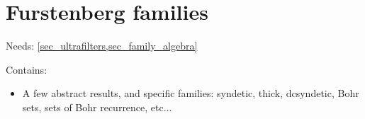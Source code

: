 



        

\section{Furstenberg families}
\label{sec_furstenberg_families}

Needs: \cref{sec_ultrafilters,sec_family_algebra}

Contains:
\begin{itemize}
    \item A few abstract results, and specific families: syndetic, thick, dcsyndetic, Bohr sets, sets of Bohr recurrence, etc...
\end{itemize}

